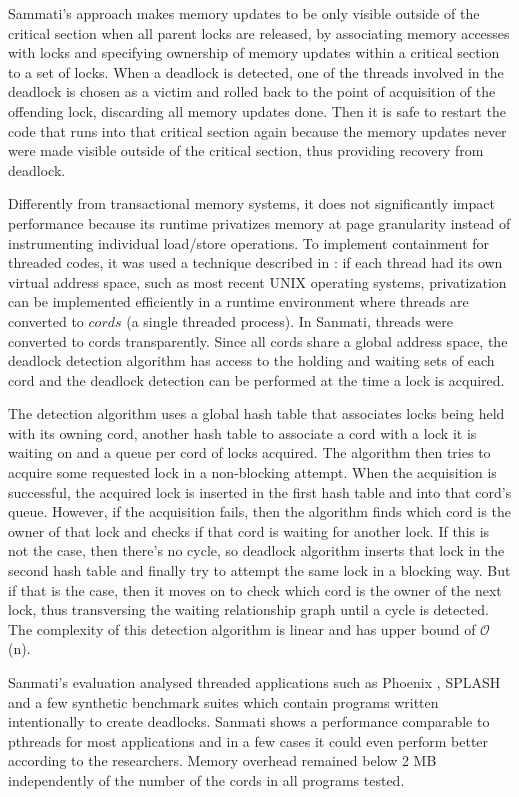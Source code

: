 Sammati's approach makes memory updates to be only visible outside of the critical section when all parent locks are released, by associating memory accesses
with locks and specifying ownership of memory updates within a critical section to a set of locks. When a deadlock is detected, one of the threads involved in the deadlock is
chosen as a victim and rolled back to the point of acquisition of the offending lock, discarding all memory updates done.
Then it is safe to restart the code that runs into that critical section again because the memory updates never were made visible outside of the critical
section, thus providing recovery from deadlock.

Differently from transactional memory systems, it does not significantly impact performance because its runtime privatizes memory at page granularity instead of instrumenting
individual load/store operations. To implement containment for threaded codes, it was used a technique described in \cite{berger}: if each thread had its own virtual address space,
such as most recent UNIX operating systems, privatization can be implemented efficiently in a runtime environment where threads are converted to $cords$ (a single threaded process).
In Sanmati, threads were converted to cords transparently. Since all cords share a global address space, the deadlock detection algorithm has access to the holding and waiting
sets of each cord and the deadlock detection can be performed at the time a lock is acquired.

The detection algorithm uses a global hash table that associates locks being held with its owning cord, another hash table to associate a cord with a lock it is waiting on and a
queue per cord of locks acquired. The algorithm then tries to acquire some requested lock in a non-blocking attempt. When the acquisition is successful, the acquired lock is
inserted in the first hash table and into that cord's queue. However, if the acquisition fails, then the algorithm finds which cord is the owner of that lock and checks if that
cord is waiting for another lock. If this is not the case, then there's no cycle, so deadlock algorithm inserts that lock in the second hash table and finally try to attempt
the same lock in a blocking way. But if that is the case, then it moves on to check which cord is the owner of the next lock, thus transversing the waiting relationship graph
until a cycle is detected. The complexity of this detection algorithm is linear and has upper bound of $\mathcal{O}$(n).

Sanmati's evaluation analysed threaded applications such as Phoenix \cite{phoenix}, SPLASH \cite{splash} and a few synthetic benchmark suites which contain programs written
intentionally to create deadlocks. Sanmati shows a performance comparable to pthreads for most applications and in a few cases it could even perform better according to the researchers.
Memory overhead remained below 2 MB independently of the number of the cords in all programs tested.

